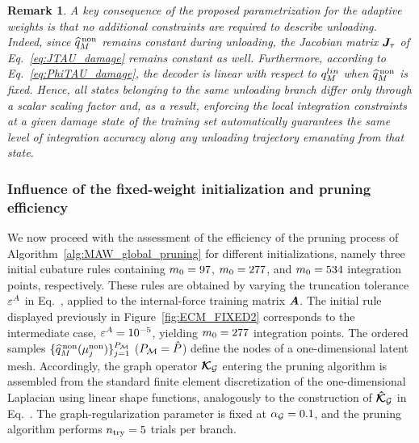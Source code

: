 \documentclass[preprint,10pt]{elsarticle}  %
\newtheorem{remark}{Remark}
\begin{document}
\begin{remark}
A key consequence of the proposed parametrization for the adaptive weights  is that no additional
constraints are required to describe unloading. Indeed, since \(\widehat{q}^{\mathrm{\,non}}_{M}\)
remains constant during unloading,   the Jacobian matrix
\(\bm{J}_{\tau}\) of Eq.~\eqref{eq:JTAU_damage} remains constant as well. Furthermore, according to Eq.~\eqref{eq:PhiTAU_damage},
the decoder is linear with respect to \({q}_M^{lin}\) when
\(\widehat{q}^{\mathrm{\,non}}_{M}\) is fixed. Hence, all states belonging to the same
unloading branch differ only through a scalar scaling factor and,  as a result, enforcing the local integration constraints at a given damage state
of the training set automatically guarantees the same level of
integration accuracy along any unloading trajectory emanating from
that state.
\end{remark}



\subsubsection{Influence of the fixed-weight initialization and pruning efficiency}
\label{sec:iniii}
We now proceed with the  assessment of the efficiency  of
the pruning process of
Algorithm~\ref{alg:MAW_global_pruning} for different initializations, namely three initial cubature
rules containing \(m_0=97\), \(m_0=277\), and
\(m_0=534\) integration points, respectively.  These rules are obtained by varying the   truncation tolerance
\(\varepsilon^A\) in Eq.~, applied to the
internal-force training matrix \(\bm{A}\). The initial rule displayed
previously in Figure~\ref{fig:ECM_FIXED2} corresponds to the
intermediate case, \(\varepsilon^A=10^{-5}\), yielding \(m_0=277\)
integration points.
The ordered samples
\(\{\widehat{q}^{\mathrm{\,non}}_{M}(\mu_{j}^{\mathrm{non}})\}_{j=1}^{P_{\mathcal{M}}}\) ($P_{\mathcal{M}} = \hat{P}$) define the nodes of
a one-dimensional latent mesh. Accordingly, the graph operator
\(\boldsymbol{\mathcal{K}}_{\mathcal{G}}\) entering the pruning algorithm is assembled from the standard
finite element discretization of the one-dimensional Laplacian using
linear shape functions, analogously to the construction of \(\boldsymbol{\mathcal{\hat{K}}}_{\mathcal{G}}\)
in Eq.~.  The graph-regularization parameter is fixed at \(\alpha_{\mathcal{G}}=0.1\), and the
pruning algorithm performs \(n_{\mathrm{try}}=5\) trials per branch.
\end{document}
